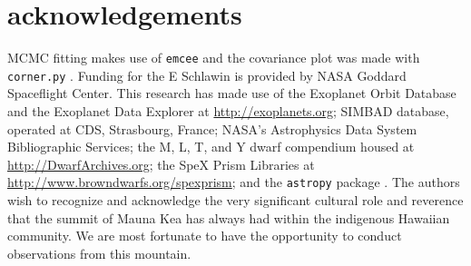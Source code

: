 \documentclass{aastex62}
\begin{document}
\section*{acknowledgements}
MCMC fitting makes use of \texttt{emcee} \citep{foreman-mackey2013emcee} and the covariance plot was made with \texttt{corner.py} \citep{foremanCorner}.
Funding for the E Schlawin is provided by NASA Goddard Spaceflight Center.
This research has made
use of the Exoplanet Orbit Database and the Exoplanet Data Explorer at \url{http://exoplanets.org}; SIMBAD database, operated at CDS, Strasbourg,
France; NASA's Astrophysics Data System Bibliographic
Services; the M, L, T, and Y dwarf compendium
housed at \url{http://DwarfArchives.org}; the SpeX Prism
Libraries at \url{http://www.browndwarfs.org/spexprism}; and the \texttt{astropy} package \citep{astropy2013}. 
The authors wish to recognize and acknowledge the very significant cultural role and reverence that the summit of Mauna Kea has always had within the indigenous Hawaiian community. We are most fortunate to have the opportunity to conduct observations from this mountain.

%

\vspace{5mm}


\end{document}
